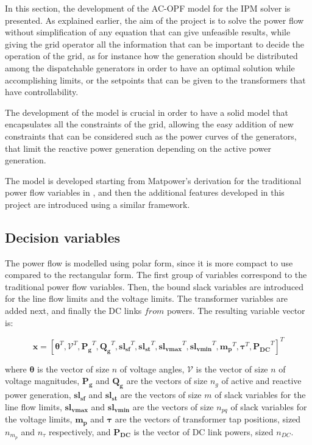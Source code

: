 
In this section, the development of the AC-OPF model for the IPM solver is presented. As explained earlier, the aim of the project is to solve the power flow without simplification of any equation that can give unfeasible results,
while giving the grid operator all the information that can be important to decide the operation of the grid, as for instance how the generation should be distributed among the dispatchable generators
in order to have an optimal solution while accomplishing limits, or the setpoints that can be given to the transformers that have controllability. 

The development of the model is crucial in order to have a solid model that encapsulates all the constraints of the grid, allowing the easy addition of new constraints that can be considered such as the power curves of the generators, that limit the reactive power
generation depending on the active power generation.

The model is developed starting from Matpower's derivation for the traditional power flow variables in \cite{zimmermanTN2}, and then the additional features developed in this project are introduced using a similar framework.

\subsection{Decision variables}

The power flow is modelled using polar form, since it is more compact to use compared to the rectangular form. The first group of variables correspond to the traditional power flow variables. Then, 
the bound slack variables are introduced for the line flow limits and the voltage limits. The transformer variables are added next, and finally the
DC links $from$ powers. The resulting variable vector is:

\begin{equation}
    \bm{x} = [\bm{\theta}^T, \bm{\mathcal{V}}^T, \bm{P_g}^T, \bm{Q_g}^T, \bm{sl_{sf}}^T, \bm{sl_{st}}^T, \bm{sl_{vmax}}^T, \bm{sl_{vmin}}^T, \bm{m_p}^T, \bm{\tau}^T, \bm{P_{DC}}^T]^T
\end{equation}

where $\bm{\theta}$ is the vector of size $n$ of voltage angles, $\bm{\mathcal{V}}$ is the vector of size $n$ of voltage magnitudes, $\bm{P_g}$ and $\bm{Q_g}$ are the vectors 
of size $n_g$ of active and reactive power generation, $\bm{sl_{sf}}$ and $\bm{sl_{st}}$ are the vectors of size $m$ of slack variables for the line flow limits, 
$\bm{sl_{vmax}}$ and $\bm{sl_{vmin}}$ are the vectors of size $n_{pq}$ of slack variables for the voltage limits, $\bm{m_p}$ and $\bm{\tau}$ are the vectors of transformer 
tap positions, sized $n_{m_p}$ and $n_{\tau}$ respectively, and $\bm{P_{DC}}$ is the vector of DC link powers, sized $n_{DC}$.

